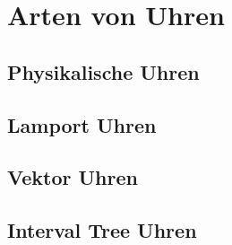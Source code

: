 \section{Arten von Uhren}
\subsection{Physikalische Uhren}
\subsection{Lamport Uhren}
\subsection{Vektor Uhren}
\subsection{Interval Tree Uhren}